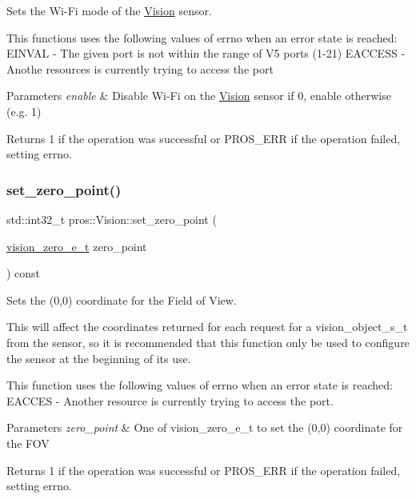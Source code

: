 Sets the Wi-\/\+Fi mode of the \mbox{\hyperlink{classpros_1_1Vision}{Vision}} sensor. 

This functions uses the following values of errno when an error state is reached\+: E\+I\+N\+V\+AL -\/ The given port is not within the range of V5 ports (1-\/21) E\+A\+C\+C\+E\+SS -\/ Anothe resources is currently trying to access the port


\begin{DoxyParams}{Parameters}
{\em enable} & Disable Wi-\/\+Fi on the \mbox{\hyperlink{classpros_1_1Vision}{Vision}} sensor if 0, enable otherwise (e.\+g. 1)\\
\hline
\end{DoxyParams}
\begin{DoxyReturn}{Returns}
1 if the operation was successful or P\+R\+O\+S\+\_\+\+E\+RR if the operation failed, setting errno. 
\end{DoxyReturn}
\mbox{\label{classpros_1_1Vision_a89e0a23b112b8632171ef27cc6f57a6c}} 
\subsubsection{\texorpdfstring{set\_zero\_point()}{set\_zero\_point()}}
{\footnotesize\ttfamily std\+::int32\+\_\+t pros\+::\+Vision\+::set\+\_\+zero\+\_\+point (\begin{DoxyParamCaption}\item[{\mbox{\hyperlink{vision_8h_a2e8bc1c48f8aab12275bfc1868fbbad6}{vision\+\_\+zero\+\_\+e\+\_\+t}}}]{zero\+\_\+point }\end{DoxyParamCaption}) const}



Sets the (0,0) coordinate for the Field of View. 

This will affect the coordinates returned for each request for a vision\+\_\+object\+\_\+s\+\_\+t from the sensor, so it is recommended that this function only be used to configure the sensor at the beginning of its use.

This function uses the following values of errno when an error state is reached\+: E\+A\+C\+C\+ES -\/ Another resource is currently trying to access the port.


\begin{DoxyParams}{Parameters}
{\em zero\+\_\+point} & One of vision\+\_\+zero\+\_\+e\+\_\+t to set the (0,0) coordinate for the F\+OV\\
\hline
\end{DoxyParams}
\begin{DoxyReturn}{Returns}
1 if the operation was successful or P\+R\+O\+S\+\_\+\+E\+RR if the operation failed, setting errno. 
\end{DoxyReturn}
\mbox{\label{classpros_1_1Vision_aa46f3bfb4956c7061b34764c92fc68fd}} 
